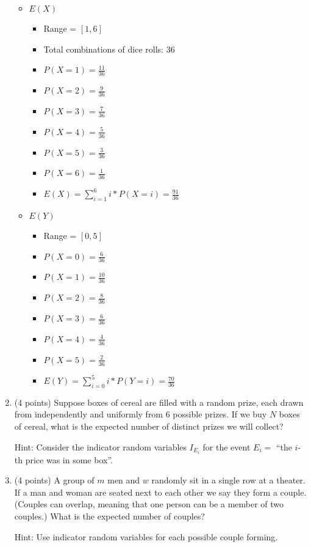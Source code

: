 \documentclass[11pt]{article}
\begin{document}
\begin{enumerate}
\begin{itemize}
	\item $E(X)$
	\begin{itemize}
		\item Range = $[1, 6]$
		\item Total combinations of dice rolls: 36
		\item $P(X=1) = \frac{11}{36}$
		\item $P(X=2) = \frac{9}{36}$
		\item $P(X=3) = \frac{7}{36}$
		\item $P(X=4) = \frac{5}{36}$
		\item $P(X=5) = \frac{3}{36}$
		\item $P(X=6) = \frac{1}{36}$
		\item $E(X) = \displaystyle\sum\limits_{i=1}^6 i*P(X=i) = \frac{91}{36}$
	\end{itemize}
	\item $E(Y)$
	\begin{itemize}
		\item Range = $[0, 5]$
		\item $P(X=0) = \frac{6}{36}$
		\item $P(X=1) = \frac{10}{36}$
		\item $P(X=2) = \frac{8}{36}$
		\item $P(X=3) = \frac{6}{36}$
		\item $P(X=4) = \frac{4}{36}$
		\item $P(X=5) = \frac{2}{36}$
		\item $E(Y) = \displaystyle\sum\limits_{i=0}^5 i*P(Y=i) = \frac{70}{36}$
	\end{itemize}
\end{itemize}

\item (4 points) Suppose boxes of cereal are filled with a random prize,
each drawn from independently and uniformly from $6$ possible prizes.
If we buy $N$ boxes of cereal, what is the expected number of distinct
prizes we will collect? \begin{small}\textsf{Hint: Consider the indicator
random variables $I_{E_i}$ for the event $E_i =$ ``the $i$-th price was
in some box''.}\end{small}

\item (4 points) A group of $m$ men and $w$ randomly sit in a single row at a
theater.  If a man and woman are seated next to each other we say they form a
couple.  (Couples can overlap, meaning that one person can be a member of two
couples.)  What is the expected number of couples?
\begin{small}\textsf{Hint: Use indicator
random variables for each possible couple forming.
}\end{small}


\end{enumerate}
\end{document}
